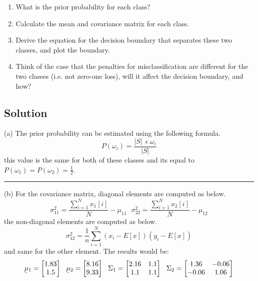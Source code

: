 \documentclass[12pt]{article}
\numberwithin{equation}{section}
\numberwithin{table}{section}
\numberwithin{figure}{section}
\begin{document}
\begin{enumerate}[label=(\alph*)]
	\item What is the prior probability for each class? 
	
	\item Calculate the mean and covariance matrix for each class. 
	
	\item Derive the equation for the decision boundary that separates these two classes, and plot the boundary.
	
	\item Think of the case that the penalties for misclassification are different for the two classes (i.e. not zero-one loss), will it affect the decision boundary, and how?
\end{enumerate}

\subsection*{Solution}
(a) The prior probability can be estimated using the following formula.
\begin{equation}
	P(\omega_i) = \frac{|S|\ \ \epsilon\ \omega_i}{|S|}
\end{equation}
this value is the same for both of these classes and its equal to $P(\omega_1) = P(\omega_2) = \frac{1}{2}$.

\noindent\rule{\textwidth}{.5pt}
(b) For the covariance matrix, diagonal elements are computed as below.
$$
	\sigma_{11}^2 = \frac{\sum_{i=1}^{N}x_1[i]}{N} - \mu_{11} \ \ \ 
	\sigma_{22}^2 = \frac{\sum_{i=1}^{N}x_2[i]}{N} - \mu_{12} 
$$
the non-diagonal elements are computed as below.
$$
	\sigma_{12}^2 = \frac{1}{n}\sum_{i=1}^{N}(x_i - E[x])(y_i - E[x])
$$
and same for the other element. The results would be:
$$
	\underaccent{\bar}{\mu}_1 = \begin{bmatrix}
	1.83\\
	1.5\\
	\end{bmatrix} \ \ 
	\underaccent{\bar}{\mu}_2 = \begin{bmatrix}
	8.16\\
	9.33\\
	\end{bmatrix} \ \ 
	\Sigma_1 = \begin{bmatrix}
	2.16 & 1.1\\
	1.1 & 1.1\\
	\end{bmatrix} \ \
	\Sigma_2 = \begin{bmatrix}
	1.36 & -0.06\\
	-0.06 & 1.06\\
	\end{bmatrix}
$$
\end{document}
